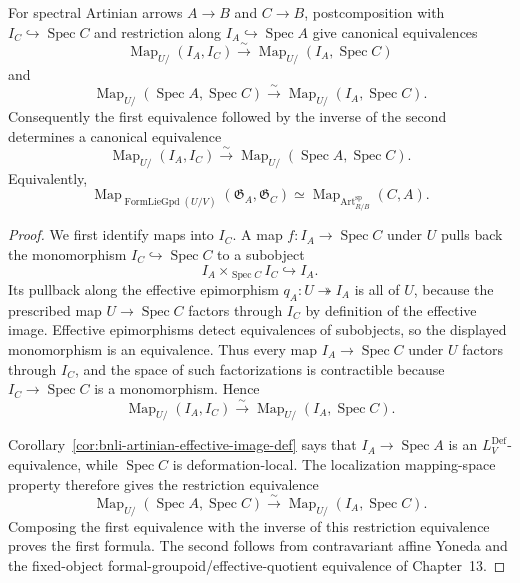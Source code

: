 \begin{proposition}
\label{prop:bnli-native-cell-fully-faithful}
For spectral Artinian arrows $A\to B$ and $C\to B$, postcomposition with
$I_C\hookrightarrow\operatorname{Spec}C$ and restriction along
$I_A\hookrightarrow\operatorname{Spec}A$ give canonical equivalences
\[
    \operatorname{Map}_{U/}(I_A,I_C)
    \xrightarrow{\sim}
    \operatorname{Map}_{U/}(I_A,\operatorname{Spec}C)
\]
and
\[
    \operatorname{Map}_{U/}(\operatorname{Spec}A,\operatorname{Spec}C)
    \xrightarrow{\sim}
    \operatorname{Map}_{U/}(I_A,\operatorname{Spec}C).
\]
Consequently the first equivalence followed by the inverse of the second
determines a canonical equivalence
\[
\boxed{
    \operatorname{Map}_{U/}(I_A,I_C)
    \xrightarrow{\sim}
    \operatorname{Map}_{U/}
    (\operatorname{Spec}A,\operatorname{Spec}C).}
\]
Equivalently,
\[
\boxed{
    \operatorname{Map}_{\operatorname{FormLieGpd}(U/V)}
    (\mathfrak G_A,\mathfrak G_C)
    \simeq
    \operatorname{Map}_{\operatorname{Art}^{\mathrm{sp}}_{R/B}}(C,A).}
\]
\end{proposition}

\begin{proof}
We first identify maps into $I_C$.  A map
$f:I_A\to\operatorname{Spec}C$ under $U$ pulls back the monomorphism
$I_C\hookrightarrow\operatorname{Spec}C$ to a subobject
\[
    I_A\times_{\operatorname{Spec}C}I_C\hookrightarrow I_A.
\]
Its pullback along the effective epimorphism $q_A:U\twoheadrightarrow I_A$ is
all of $U$, because the prescribed map $U\to\operatorname{Spec}C$ factors
through $I_C$ by definition of the effective image.  Effective epimorphisms
detect equivalences of subobjects, so the displayed monomorphism is an
equivalence.  Thus every map $I_A\to\operatorname{Spec}C$ under $U$ factors
through $I_C$, and the space of such factorizations is contractible because
$I_C\to\operatorname{Spec}C$ is a monomorphism.  Hence
\[
    \operatorname{Map}_{U/}(I_A,I_C)
    \xrightarrow{\sim}
    \operatorname{Map}_{U/}(I_A,\operatorname{Spec}C).
\]

Corollary~\ref{cor:bnli-artinian-effective-image-def} says that
$I_A\to\operatorname{Spec}A$ is an $L_V^{\mathrm{Def}}$-equivalence, while
$\operatorname{Spec}C$ is deformation-local.  The localization mapping-space
property therefore gives the restriction equivalence
\[
    \operatorname{Map}_{U/}(\operatorname{Spec}A,\operatorname{Spec}C)
    \xrightarrow{\sim}
    \operatorname{Map}_{U/}(I_A,\operatorname{Spec}C).
\]
Composing the first equivalence with the inverse of this restriction
equivalence proves the first formula.  The second follows from contravariant
affine Yoneda and the fixed-object formal-groupoid/effective-quotient
equivalence of Chapter~13.
\end{proof}

